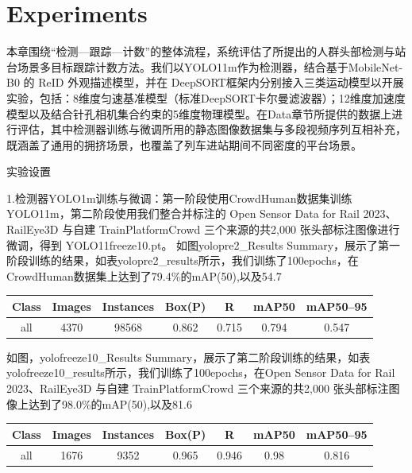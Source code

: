 \section{Experiments}\label{section::Experiments}


本章围绕“检测—跟踪—计数”的整体流程，系统评估了所提出的人群头部检测与站台场景多目标跟踪计数方法。我们以YOLO11m作为检测器，结合基于MobileNet-B0 的 ReID 外观描述模型，并在 DeepSORT框架内分别接入三类运动模型以开展实验，包括：8维度匀速基准模型（标准DeepSORT卡尔曼滤波器）；12维度加速度模型以及结合针孔相机集合约束的5维度物理模型。在Data章节所提供的数据上进行评估，其中检测器训练与微调所用的静态图像数据集与多段视频序列互相补充，既涵盖了通用的拥挤场景，也覆盖了列车进站期间不同密度的平台场景。

实验设置

1.检测器YOLO1m训练与微调：第一阶段使用CrowdHuman数据集训练YOLO11m，第二阶段使用我们整合并标注的 Open Sensor Data for Rail 2023、RailEye3D 与自建 TrainPlatformCrowd 三个来源的共2,000 张头部标注图像进行微调，得到 YOLO11freeze10.pt。
如图yolopre2_Results Summary，展示了第一阶段训练的结果，如表yolopre2_results所示，我们训练了100epochs，在CrowdHuman数据集上达到了79.4\%的mAP(50),以及54.7%
\begin{table}[h!]
    \centering
    \setlength{\tabcolsep}{12pt} %
    \renewcommand{\arraystretch}{1.3} %
    \begin{tabular}{|c|c|c|c|c|c|c|}
    \hline
    \textbf{Class} & \textbf{Images} & \textbf{Instances} & \textbf{Box(P)} & \textbf{R} & \textbf{mAP50} & \textbf{mAP50--95} \\
    \hline
    \rowcolor{blue!20}
    all & 4370 & 98568 & 0.862 & 0.715 & 0.794 & 0.547 \\
    \hline
    \end{tabular}
    \end{table}
    \caption{YOLO11m在CrowdHuman数据集上的训练结果}
    \label{tab:yolopre2_results}
如图，yolofreeze10_Results Summary，展示了第二阶段训练的结果，如表yolofreeze10_results所示，我们训练了100epochs，在Open Sensor Data for Rail 2023、RailEye3D 与自建 TrainPlatformCrowd 三个来源的共2,000 张头部标注图像上达到了98.0\%的mAP(50),以及81.6%

\begin{table}[h!]
    \centering
    \setlength{\tabcolsep}{12pt} %
    \renewcommand{\arraystretch}{1.3} %
    \begin{tabular}{|c|c|c|c|c|c|c|}
    \hline
    \textbf{Class} & \textbf{Images} & \textbf{Instances} & \textbf{Box(P)} & \textbf{R} & \textbf{mAP50} & \textbf{mAP50--95} \\
    \hline
    \rowcolor{blue!20}
    all & 1676 & 9352 & 0.965 & 0.946 & 0.98 & 0.816 \\
    \hline
    \end{tabular}
    \end{table}
    \caption{YOLO11m在CrowdHuman数据集上的训练结果}
    \label{tab:yolofreeze10_results}


